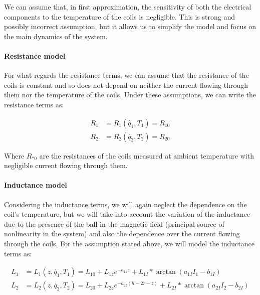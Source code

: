 We can assume that, in first approximation, the sensitivity of both the electrical components to the temperature of the coils is negligible.
This is strong and possibly incorrect assumption, but it allows us to simplify the model and focus on the main dynamics of the system.

\paragraph{Resistance model}

For what regards the resistance terms, we can assume that the resistance of the coils is constant and so does not depend on neither the current flowing through them nor the temperature of the coils.
Under these assumptions, we can write the resistance terms as:

\begin{equation}
    \begin{aligned}
        R_1 & = R_1(\dot{q_1}, T_1) = R_{10} \\
        R_2 & = R_2(\dot{q_2}, T_2) = R_{20}
    \end{aligned}
    \label{eq:model_for_resistance}
\end{equation}

Where $R_{*0}$ are the resistances of the coils measured at ambient temperature with negligible current flowing through them.

\paragraph{Inductance model}

Considering the inductance terms, we will again neglect the dependence on the coil's temperature, but we will take into account the variation of the inductance due to the presence of the ball in the magnetic field (principal source of nonlinearity in the system) and also the dependence over the current flowing through the coils.
For the assumption stated above, we will model the inductance terms as:

\begin{equation}
    \begin{aligned}
        L_1 & = L_1(z, \dot{q_1}, T_1) = L_{10} + L_{1z} e^{-a_{1z} z} + L_{1I} * \arctan(a_{1I} I_{1} - b_{1I})            \\
        L_2 & = L_2(z, \dot{q_2}, T_2) = L_{20} + L_{2z} e^{-a_{2z} (h - 2r - z)} + L_{2I} * \arctan(a_{2I} I_{2} - b_{2I})
    \end{aligned}
    \label{eq:model_for_inductance}
\end{equation}

